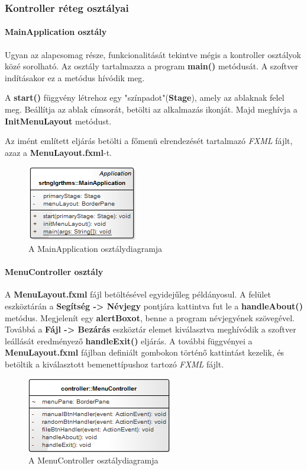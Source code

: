\documentclass{elteikthesis}
\begin{document}
\subsubsection{Kontroller réteg osztályai}
\paragraph{MainApplication osztály}
Ugyan az alapcsomag része, funkcionalitását tekintve mégis a kontroller osztályok közé sorolható. Az osztály tartalmazza a program \textbf{main()} metódusát. A szoftver indításakor ez a metódus hívódik meg.\par
A \textbf{start()} függvény létrehoz egy "színpadot"(\textbf{Stage}), amely az ablaknak felel meg. Beállítja az ablak címsorát, betölti az alkalmazás ikonját. Majd meghívja a \textbf{InitMenuLayout} metódust.\par
Az imént említett eljárás betölti a főmenü elrendezését tartalmazó \emph{FXML} fájlt, azaz a \textbf{MenuLayout.fxml}-t.
\begin{figure}[H]
	\centering
	\includegraphics{pics/class/MainApplication.png}
	\caption{A MainApplication osztálydiagramja}
\end{figure}\par
\paragraph{MenuController osztály}
A \textbf{MenuLayout.fxml} fájl betöltésével egyidejűleg példányosul. A felület eszköztárán a \textbf{Segítség -> Névjegy} pontjára kattintva fut le a \textbf{handleAbout()} metódus. Megjelenít egy \textbf{alertBoxot}, benne a program névjegyének szövegével. Továbbá a \textbf{Fájl -> Bezárás} eszköztár elemet kiválasztva meghívódik a szoftver leállását eredményező \textbf{handleExit()} eljárás. A további függvényei a \textbf{MenuLayout.fxml} fájlban definiált gombokon történő kattintást kezelik, és betöltik a kiválasztott bemenettípushoz tartozó \emph{FXML} fájlt.
\begin{figure}[H]
	\centering
	\includegraphics{pics/class/MenuController.png}
	\caption{A MenuController osztálydiagramja}
\end{figure}\par
\end{document}
